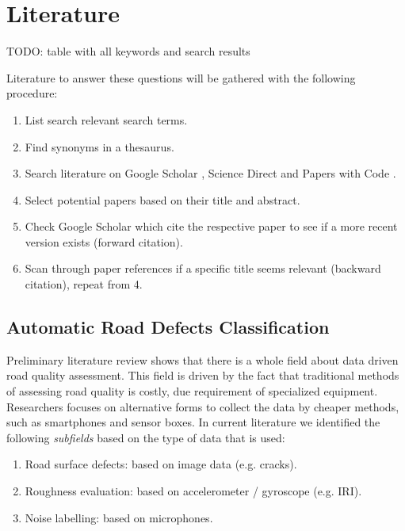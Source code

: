 \clearpage
\section{Literature}

TODO: table with all keywords and search results

Literature to answer these questions will be gathered with the following procedure:
\begin{enumerate}
\item List search relevant search terms.
\item Find synonyms in a thesaurus.
\item Search literature on Google Scholar \cite{scholar}, Science Direct \cite{science-direct} and Papers with Code \cite{paperswithcode}. 
\item Select potential papers based on their title and abstract.
\item Check Google Scholar which cite the respective paper to see if a more recent version exists (forward citation).
\item Scan through paper references if a specific title seems relevant (backward citation), repeat from 4.
\end{enumerate}



\subsection{Automatic Road Defects Classification}

Preliminary literature review shows that there is a whole field about data driven road quality assessment. This field is driven by the fact that traditional methods of assessing road quality is costly, due requirement of specialized equipment. Researchers focuses on alternative forms to collect the data by cheaper methods, such as smartphones and sensor boxes. In current literature we identified the following \textit{subfields} based on the type of data that is used:

\begin{enumerate}
\item Road surface defects: based on image data (e.g. cracks).
\item Roughness evaluation: based on accelerometer / gyroscope (e.g. IRI).
\item Noise labelling: based on microphones.
\end{enumerate}

